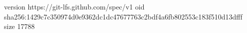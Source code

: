 version https://git-lfs.github.com/spec/v1
oid sha256:1429c7c350974d0e9362dc1dc47677763c2bdf4a6fb802553c183f510d13dfff
size 17788
